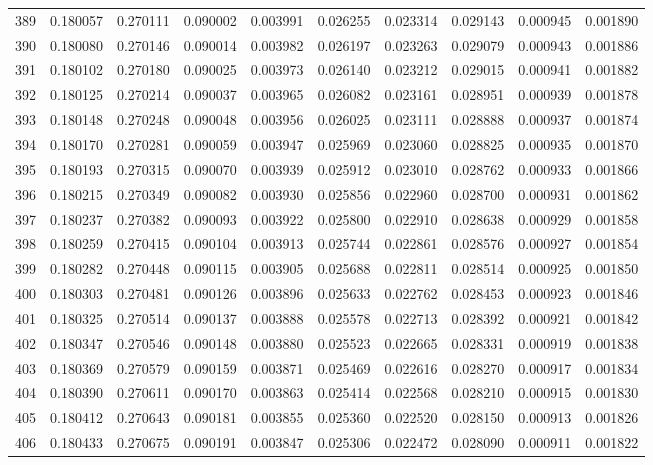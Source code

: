 \begin{tabular}{lrrrrrrrrr}
389 & 0.180057 & 0.270111 & 0.090002 & 0.003991 & 0.026255 & 0.023314 & 0.029143 & 0.000945 & 0.001890 \\
390 & 0.180080 & 0.270146 & 0.090014 & 0.003982 & 0.026197 & 0.023263 & 0.029079 & 0.000943 & 0.001886 \\
391 & 0.180102 & 0.270180 & 0.090025 & 0.003973 & 0.026140 & 0.023212 & 0.029015 & 0.000941 & 0.001882 \\
392 & 0.180125 & 0.270214 & 0.090037 & 0.003965 & 0.026082 & 0.023161 & 0.028951 & 0.000939 & 0.001878 \\
393 & 0.180148 & 0.270248 & 0.090048 & 0.003956 & 0.026025 & 0.023111 & 0.028888 & 0.000937 & 0.001874 \\
394 & 0.180170 & 0.270281 & 0.090059 & 0.003947 & 0.025969 & 0.023060 & 0.028825 & 0.000935 & 0.001870 \\
395 & 0.180193 & 0.270315 & 0.090070 & 0.003939 & 0.025912 & 0.023010 & 0.028762 & 0.000933 & 0.001866 \\
396 & 0.180215 & 0.270349 & 0.090082 & 0.003930 & 0.025856 & 0.022960 & 0.028700 & 0.000931 & 0.001862 \\
397 & 0.180237 & 0.270382 & 0.090093 & 0.003922 & 0.025800 & 0.022910 & 0.028638 & 0.000929 & 0.001858 \\
398 & 0.180259 & 0.270415 & 0.090104 & 0.003913 & 0.025744 & 0.022861 & 0.028576 & 0.000927 & 0.001854 \\
399 & 0.180282 & 0.270448 & 0.090115 & 0.003905 & 0.025688 & 0.022811 & 0.028514 & 0.000925 & 0.001850 \\
400 & 0.180303 & 0.270481 & 0.090126 & 0.003896 & 0.025633 & 0.022762 & 0.028453 & 0.000923 & 0.001846 \\
401 & 0.180325 & 0.270514 & 0.090137 & 0.003888 & 0.025578 & 0.022713 & 0.028392 & 0.000921 & 0.001842 \\
402 & 0.180347 & 0.270546 & 0.090148 & 0.003880 & 0.025523 & 0.022665 & 0.028331 & 0.000919 & 0.001838 \\
403 & 0.180369 & 0.270579 & 0.090159 & 0.003871 & 0.025469 & 0.022616 & 0.028270 & 0.000917 & 0.001834 \\
404 & 0.180390 & 0.270611 & 0.090170 & 0.003863 & 0.025414 & 0.022568 & 0.028210 & 0.000915 & 0.001830 \\
405 & 0.180412 & 0.270643 & 0.090181 & 0.003855 & 0.025360 & 0.022520 & 0.028150 & 0.000913 & 0.001826 \\
406 & 0.180433 & 0.270675 & 0.090191 & 0.003847 & 0.025306 & 0.022472 & 0.028090 & 0.000911 & 0.001822 \\

\end{tabular}
